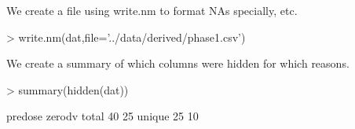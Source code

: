 We create a file using write.nm to format NAs specially, etc.
\begin{Schunk}
\begin{Sinput}
> write.nm(dat,file='../data/derived/phase1.csv')
\end{Sinput}
\end{Schunk}
We create a summary of which columns were hidden for which reasons.
\begin{Schunk}
\begin{Sinput}
> summary(hidden(dat))
\end{Sinput}
\begin{Soutput}
       predose zerodv
total       40     25
unique      25     10
\end{Soutput}
\end{Schunk}





